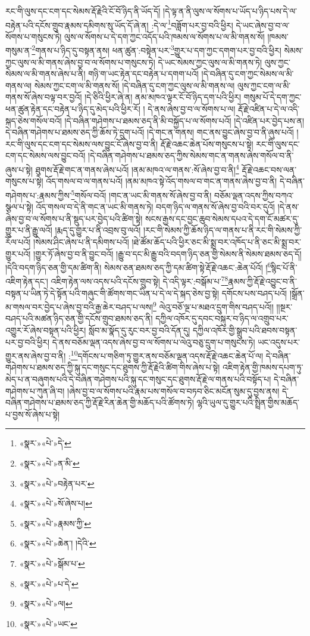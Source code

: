རང་གི་ལུས་དང་ངག་དང་སེམས་རྡོ་རྗེའི་ངོ་བོ་ཉིད་ནི་ཡོད་དོ། །དེ་ལྟ་ན་ནི་ལུས་ལ་སོགས་པ་ཡོད་པ་ཉིད་པས་དེ་ལ་བརྟེན་པའི་དངོས་གྲུབ་རྣམས་དམིགས་སུ་ཡོད་དོ་ཞེ་ན། :དེ་ལ་\footnote{«སྣར་»«པེ་»དེ་}བཟློག་པར་བྱ་བའི་ཕྱིར། དེ་ཡང་ཞེས་བྱ་བ་ལ་སོགས་པ་གསུངས་ཏེ། ལུས་ལ་སོགས་པ་དེ་དག་ཀྱང་འདོད་པའི་ཁམས་ལ་སོགས་པ་ལ་མི་གནས་སོ། །ཁམས་གསུམ་ན་\footnote{«སྣར་»«པེ་»ན་མི་}གནས་པ་ཉིད་དུ་བསྟན་ནས། ཕན་ཚུན་:བསྟེན་པར་\footnote{«སྣར་»«པེ་»བརྟེན་པར་}གྱུར་པ་དག་ཀྱང་དགག་པར་བྱ་བའི་ཕྱིར། སེམས་ཀྱང་ལུས་ལ་མི་གནས་ཞེས་བྱ་བ་ལ་སོགས་པ་གསུངས་ཏེ། དེ་ཡང་སེམས་ཀྱང་ལུས་ལ་མི་གནས་ཏེ། ལུས་ཀྱང་སེམས་ལ་མི་གནས་ཞེས་པ་ནི། གཉི་ག་ཡང་རྟེན་དང་བརྟེན་པ་དགག་པའོ། །དེ་བཞིན་དུ་ངག་ཀྱང་སེམས་ལ་མི་གནས་ལ། སེམས་ཀྱང་ངག་ལ་མི་གནས་སོ། །དེ་བཞིན་དུ་ངག་ཀྱང་ལུས་ལ་མི་གནས་ལ། ལུས་ཀྱང་ངག་ལ་མི་གནས་སོ་ཞེས་བལྟ་བར་བྱའོ། །དེ་ཅིའི་ཕྱིར་ཞེ་ན། ནམ་མཁའ་ལྟར་ངོ་བོ་ཉིད་དག་པའི་ཕྱིར། གསུམ་པོ་དེ་དག་ཀྱང་ཕན་ཚུན་རྟེན་དང་བརྟེན་པ་ཉིད་དུ་མེད་པའི་ཕྱིར་རོ། །
དེ་ནས་ཞེས་བྱ་བ་ལ་སོགས་པ་ལ། རྡོ་རྗེ་འཛིན་པ་དེ་ལ་འདི་སྐད་ཅེས་གསོལ་བའོ། །དེ་བཞིན་གཤེགས་པ་ཐམས་ཅད་ནི་མི་བསྐྱོད་པ་ལ་སོགས་པའོ། །དེ་འཛིན་པར་བྱེད་པས་ན། དེ་བཞིན་གཤེགས་པ་ཐམས་ཅད་ཀྱི་ཆོས་ཏེ་དྲུག་པའོ། །དེ་གང་ན་གནས། གང་ནས་བྱུང་ཞེས་བྱ་བ་ནི་ཞུས་པའོ། །རང་གི་ལུས་དང་ངག་དང་སེམས་ལས་བྱུང་ངོ་ཞེས་བྱ་བ་ནི། རྡོ་རྗེ་འཆང་ཆེན་པོས་གསུངས་པ་སྟེ། རང་གི་ལུས་དང་ངག་དང་སེམས་ལས་བྱུང་བའོ། །དེ་བཞིན་གཤེགས་པ་ཐམས་ཅད་ཀྱིས་སེམས་གང་ན་གནས་ཞེས་གསོལ་བ་ནི་ཞུས་པ་སྟེ། ཐུགས་རྡོ་རྗེ་གང་ན་གནས་ཞེས་པའོ། །ནམ་མཁའ་ལ་གནས་:སོ་ཞེས་བྱ་བ་ནི།\footnote{«སྣར་»«པེ་»སོ་ཞེས་པ།} རྡོ་རྗེ་འཆང་བས་ལན་གསུངས་པ་སྟེ། འོད་གསལ་བ་ལ་གནས་པའོ། །ནམ་མཁའ་སྟེ་འོད་གསལ་བ་གང་ན་གནས་ཞེས་བྱ་བ་ནི། དེ་བཞིན་གཤེགས་པ་:རྣམས་ཀྱིས་\footnote{«སྣར་»«པེ་»རྣམས་ཀྱི་}གསོལ་བའོ། །གང་ན་ཡང་མི་གནས་སོ་ཞེས་བྱ་བ་ནི། བཅོམ་ལྡན་འདས་ཀྱིས་བཀའ་སྩལ་པ་སྟེ། འོད་གསལ་བ་དེ་ནི་གང་ན་ཡང་མི་གནས་ཏེ། བདག་ཉིད་ལ་གནས་སོ་ཞེས་བྱ་བའི་བར་དུའོ། །དེ་ནས་ཞེས་བྱ་བ་ལ་སོགས་པ་ནི་སྡུད་པར་བྱེད་པའི་ཚིག་སྟེ། སངས་རྒྱས་དང་བྱང་ཆུབ་སེམས་དཔའ་དེ་དག་ངོ་མཚར་དུ་གྱུར་པ་ནི་རྒྱུ་ལའོ། །རྨད་དུ་གྱུར་པ་ནི་འབྲས་བུ་ལའོ། །རང་གི་སེམས་ཀྱི་ཆོས་ཉིད་ལ་གནས་པ་ནི་རང་གི་སེམས་ཀྱི་རོལ་པའོ། །སེམས་ཤིང་ཞེས་པ་ནི་དམིགས་པའོ། །ཐེ་ཚོམ་ཆོད་པའི་ཕྱིར་ཅང་མི་སྨྲ་བར་འཁོད་པ་ནི་ཅང་མི་སྨྲ་བར་གྱུར་པའོ། །གྱུར་ཏོ་ཞེས་བྱ་བ་ནི་བྱུང་བའོ། །རྒྱུ་བ་དང་མི་རྒྱུ་བའི་བདག་ཉིད་ཅན་གྱི་སེམས་ནི་སེམས་ཐམས་ཅད་དོ། །དེའི་བདག་ཉིད་ཅན་གྱི་དམ་ཚིག་ནི། སེམས་ཅན་ཐམས་ཅད་ཀྱི་དམ་ཚིག་སྟེ་རྡོ་རྗེ་འཆང་:ཆེན་པོའོ། །\footnote{«སྣར་»«པེ་»ཆེན་། །དེའི་}སྙིང་པོ་ནི་འཇིག་རྟེན་དང་། འཇིག་རྟེན་ལས་འདས་པའི་དངོས་གྲུབ་སྟེ། དེ་འདི་ལྟར་:བསྒོམ་པ་\footnote{«སྣར་»«པེ་»སྒོམ་པ་}\footnote{«སྣར་»«པེ་»པ་དེ་}རྣམས་ཀྱི་རྡོ་རྗེ་འབྱུང་བ་ནི་བསྟན་པ་ཡིན་ཏེ་དེ་སྟོན་པའི་གཞུང་གི་ཚོགས་གང་ཡིན་པ་དེ་ལ་དེ་སྐད་ཅེས་བྱ་སྟེ། དགོངས་པས་བཤད་པའོ། །སྒྲོན་མ་གསལ་བར་བྱེད་པ་ཞེས་བྱ་བའི་རྒྱ་ཆེར་བཤད་པ་ལས།\footnote{«སྣར་»«པེ་»ལ།} ལེའུ་བཅོ་ལྔ་པ་མཐའ་དྲུག་གིས་བཤད་པའོ།། །།སྔར་བཤད་པའི་མཚན་ཉིད་ཅན་གྱི་དངོས་གྲུབ་ཐམས་ཅད་ནི། དཀྱིལ་འཁོར་དུ་དབང་བསྐུར་བ་ཉིད་ལ་འགྲུབ་པར་འགྱུར་རོ་ཞེས་བསྟན་པའི་ཕྱིར། སློབ་མ་སྣོད་དུ་རུང་བར་བྱ་བའི་དོན་དུ། དཀྱིལ་འཁོར་གྱི་སྒྲུབ་པའི་ཐབས་བསྟན་པར་བྱ་བའི་ཕྱིར། དེ་ནས་བཅོམ་ལྡན་འདས་ཞེས་བྱ་བ་ལ་སོགས་པ་ལེའུ་བཅུ་དྲུག་པ་གསུངས་ཏེ། ཡང་འདུས་པར་གྱུར་ནས་ཞེས་བྱ་བ་ནི། :\footnote{«སྣར་»«པེ་»ཡང་}དགོངས་པ་གཅིག་ཏུ་གྱུར་ནས་བཅོམ་ལྡན་འདས་རྡོ་རྗེ་འཆང་ཆེན་པོ་ལ། དེ་བཞིན་གཤེགས་པ་ཐམས་ཅད་ཀྱི་སྐུ་དང་གསུང་དང་ཐུགས་ཀྱི་རྡོ་རྗེའི་ཚིག་གིས་ཞེས་པ་སྟེ། འཇིག་རྟེན་གྱི་ཁམས་དཔག་ཏུ་མེད་པ་ན་བཞུགས་པའི་དེ་བཞིན་གཤེགས་པའི་སྐུ་དང་གསུང་དང་ཐུགས་རྡོ་རྗེ་ལ་གནས་པའི་བསྟོད་པ། དེ་བཞིན་གཤེགས་པ་ཀུན་ཞི་བ། །ཞེས་བྱ་བ་ལ་སོགས་པའི་རྣམ་པས་གསོལ་བ་བཏབ་ཅིང་མངོན་སུམ་དུ་བྱས་ནས། དེ་བཞིན་གཤེགས་པ་ཐམས་ཅད་ཀྱི་རྡོ་རྗེ་རིན་ཆེན་གྱི་མཆོད་པའི་ཚོགས་ཏེ། ལྷའི་ཡུལ་དུ་གྱུར་པའི་སྤྲིན་གྱིས་མཆོད་པ་བྱས་སོ་ཞེས་པ་སྟེ། 